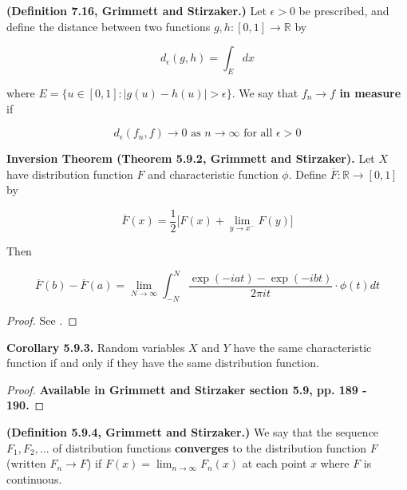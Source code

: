\begin{definition} \textbf{(Definition 7.16, Grimmett and Stirzaker.)} Let \(\epsilon > 0\) be prescribed, and define the distance between two functions \(g, h: [0, 1] \to \mathbb{R}\) by

\[
d_\epsilon(g,h) = \int_E dx
\]

where \(E = \{ u \in[0, 1] : |g(u) - h(u)| > \epsilon \}\). We say that \textbf{ \(f_n \to f\) in measure} if 

\[
d_\epsilon(f_n, f) \to 0 \text{ as } n \to \infty \text{ for all } \epsilon > 0
\]

\end{definition}

\begin{theorem} \textbf{Inversion Theorem (Theorem 5.9.2, Grimmett and Stirzaker).} Let \(X\) have distribution function \(F\) and characteristic function \(\phi\). Define \(\overline{F}: \mathbb{R} \to [0, 1]\) by

\[
\overline{F}(x) = \frac{1}{2} \big[ F(x) + \lim_{y \to x^-} F(y) \big]
\]

Then

\[
\overline{F}(b) - \overline{F}(a) = \lim_{N \to \infty} \int_{-N}^N \frac{\exp(-iat) - \exp(-ibt)}{2\pi i t} \cdot \phi(t) dt
\]

\end{theorem}

\begin{proof} See \citet{kingman1966introduction}. \end{proof}

\begin{corollary} \textbf{Corollary 5.9.3.} Random variables \(X\) and \(Y\) have the same characteristic function if and only if they have the same distribution function.
\end{corollary}

\begin{proof} \textbf{Available in Grimmett and Stirzaker section 5.9, pp. 189 - 190.} \end{proof}

\begin{definition} \textbf{(Definition 5.9.4, Grimmett and Stirzaker.)} We say that the sequence \(F_1, F_2, \ldots\) of distribution functions \textbf{converges} to the distribution function \(F\) (written \(F_n \to F\)) if \(F(x) = \lim_{n\to \infty} F_n(x)\) at each point \(x\) where \(F\) is continuous.
\end{definition}

